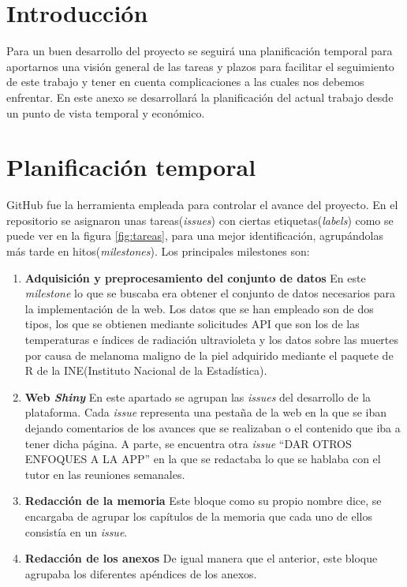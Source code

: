 
\section{Introducción}

Para un buen desarrollo del proyecto se seguirá una planificación temporal para aportarnos una visión general de las tareas y plazos para facilitar el seguimiento de este trabajo y tener en cuenta complicaciones a las cuales nos debemos enfrentar. 
En este anexo se desarrollará la planificación del actual trabajo desde un punto de vista temporal y económico.



\section{Planificación temporal}
GitHub fue la herramienta empleada para controlar el avance del proyecto. En el repositorio se asignaron unas tareas(\textit{issues}) con ciertas etiquetas(\textit{labels}) como se puede ver en la figura \ref{fig:tareas}, para una mejor identificación, agrupándolas más tarde en hitos(\textit{milestones}).
Los principales milestones son:
\begin{enumerate}
    \item \textbf{Adquisición y preprocesamiento del conjunto de datos}
En este \textit{milestone} lo que se buscaba era obtener el conjunto de datos necesarios para la implementación de la web. Los datos que se han empleado son de dos tipos, los que se obtienen mediante solicitudes API que son los de las temperaturas e índices de radiación ultravioleta y los datos sobre las muertes por causa de melanoma maligno de la piel adquirido mediante el paquete de R  de la INE(Instituto Nacional de la Estadística).
\item \textbf{Web \textit{Shiny}}
En este apartado se agrupan las \textit{issues} del desarrollo de la plataforma. Cada \textit{issue} representa una pestaña de la web en la que se iban dejando comentarios de los avances que se realizaban o el contenido que iba a tener dicha página. A parte, se encuentra otra \textit{issue} ``DAR OTROS ENFOQUES A LA APP'' en la que se redactaba lo que se hablaba con el tutor en las reuniones semanales.
\item \textbf{Redacción de la memoria}
Este bloque como su propio nombre dice, se encargaba de agrupar los capítulos de la memoria que cada uno de ellos consistía en un \textit{issue}.
\item \textbf{Redacción de los anexos}
De igual manera que el anterior, este bloque agrupaba los diferentes apéndices de los anexos.
\end{enumerate}
